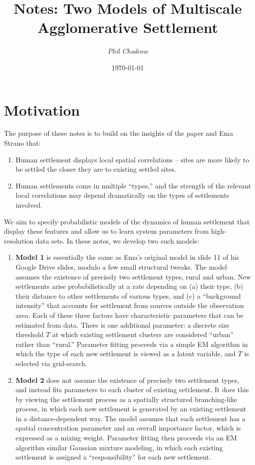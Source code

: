 \documentclass[english]{scrartcl}
\title{Notes: Two Models of Multiscale Agglomerative Settlement}
\author{\emph{Phil Chodrow}}
\date{\today}
\begin{document}

\maketitle


\section{Motivation}

	The purpose of these notes is to build on the insights of the paper \citet{Rybski2013} and Ema Strano that:
	\begin{enumerate}
		\item Human settlement displays local spatial correlations -- sites are more likely to be settled the closer they are to existing settled sites. 
		\item Human settlements come in multiple ``types,'' and the strength of the relevant local correlations may depend dramatically on the types of settlements involved. 
	\end{enumerate}
	We aim to specify probabilistic models of the dynamics of human settlement that display these features and allow us to learn system parameters from high-resolution data sets. 
	In these notes, we develop two such models: 
	\begin{enumerate}
		\item \textbf{Model 1} is essentially the same as Ema's original model in slide 11 of his Google Drive slides, modulo a few small structural tweaks. 
		The model assumes the existence of precisely two settlement types, rural and urban. 
		New settlements arise probabilistically at a rate depending on (a) their type, (b) their distance to other settlements of various types, and (c) a ``background intensity'' that accounts for settlement from sources outside the observation area. 
		Each of these three factors have characteristic parameters that can be estimated from data. 
		There is one additional parameter: a discrete size threshold $T$ at which existing settlement clusters are considered ``urban'' rather than ``rural.''
		Parameter fitting proceeds via a simple EM algorithm in which the type of each new settlement is viewed as a latent variable, and $T$ is selected via grid-search. 
		\item \textbf{Model 2} does not assume the existence of precisely two settlement types, and instead fits parameters to each cluster of existing settlement. 
		It does this by viewing the settlement process as a spatially structured branching-like process, in which each new settlement is generated by an existing settlement in a distance-dependent way. 
		The model assumes that each settlement has a spatial concentration parameter and an overall importance factor, which is expressed as a mixing weight. 
		Parameter fitting then proceeds via an EM algorithm similar Gaussian mixture modeling, in which each existing settlement is assigned a ``responsibility'' for each new settlement.
  	\end{enumerate}
\end{document}

